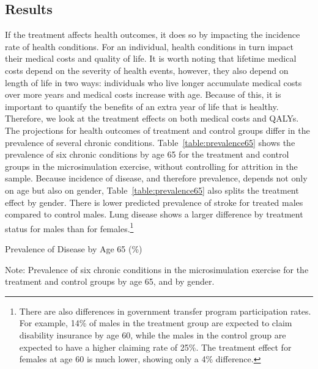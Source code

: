 \subsection{Results}

\noindent If the treatment affects health outcomes, it does so by impacting the incidence rate of health conditions. For an individual, health conditions in turn impact their medical costs and quality of life. It is worth noting that lifetime medical costs depend on the severity of health events, however, they also depend on length of life in two ways: individuals who live longer accumulate medical costs over more years and medical costs increase with age. Because of this, it is important to quantify the benefits of an extra year of life that is healthy. Therefore, we look at the treatment effects on both medical costs and QALYs. \\

\noindent The projections for health outcomes of treatment and control groups differ in the prevalence of several chronic conditions. Table~\ref{table:prevalence65} shows the prevalence of six chronic conditions by age 65 for the treatment and control groups in the microsimulation exercise, without controlling for attrition in the sample. Because incidence of disease, and therefore prevalence, depends not only on age but also on gender, Table~\ref{table:prevalence65} also splits the treatment effect by gender. There is lower predicted prevalence of stroke for treated males compared to control males. Lung disease shows a larger difference by treatment status for males than for females.\footnote{There are also differences in government transfer program participation rates. For example, 14\% of males in the treatment group are expected to claim disability insurance by age 60, while the males in the control group are expected to have a higher claiming rate of 25\%. The treatment effect for females at age 60 is much lower, showing only a 4\% difference.} \\

\begin{table}[H]
\begin{threeparttable}
\footnotesize
\caption{Prevalence of Disease by Age 65 (\%)} \label{table:prevalence65}

\begin{tablenotes}
\footnotesize
\item Note: Prevalence of six chronic conditions in the microsimulation exercise for the treatment and control groups by age 65, and by gender.
\end{tablenotes}
\end{threeparttable}
\end{table}

